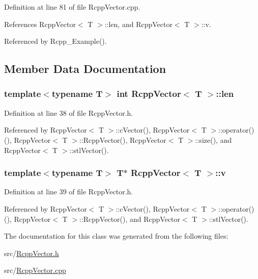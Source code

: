 Definition at line 81 of file RcppVector.cpp.

References RcppVector$<$ T $>$::len, and RcppVector$<$ T $>$::v.

Referenced by Rcpp\_\-Example().

\subsection{Member Data Documentation}
\hypertarget{classRcppVector_a733f5ed23ade0723338904f9f08457d6}{
\subsubsection[{len}]{\setlength{\rightskip}{0pt plus 5cm}template$<$typename T$>$ int {\bf RcppVector}$<$ T $>$::{\bf len}}}
\label{classRcppVector_a733f5ed23ade0723338904f9f08457d6}


Definition at line 38 of file RcppVector.h.

Referenced by RcppVector$<$ T $>$::cVector(), RcppVector$<$ T $>$::operator()(), RcppVector$<$ T $>$::RcppVector(), RcppVector$<$ T $>$::size(), and RcppVector$<$ T $>$::stlVector().\hypertarget{classRcppVector_ac810c53db4c1b978bada104b38484b26}{
\subsubsection[{v}]{\setlength{\rightskip}{0pt plus 5cm}template$<$typename T$>$ T$\ast$ {\bf RcppVector}$<$ T $>$::{\bf v}}}
\label{classRcppVector_ac810c53db4c1b978bada104b38484b26}


Definition at line 39 of file RcppVector.h.

Referenced by RcppVector$<$ T $>$::cVector(), RcppVector$<$ T $>$::operator()(), RcppVector$<$ T $>$::RcppVector(), and RcppVector$<$ T $>$::stlVector().

The documentation for this class was generated from the following files:\begin{DoxyCompactItemize}
\item 
src/\hyperlink{RcppVector_8h}{RcppVector.h}\item 
src/\hyperlink{RcppVector_8cpp}{RcppVector.cpp}\end{DoxyCompactItemize}
